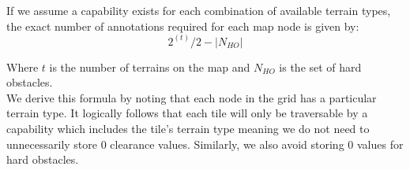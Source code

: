 If we assume a capability exists for each combination of available terrain types, the exact number of annotations required for each map node is given by:
\begin{equation}
2^(t)/2 - |N_{HO}|
\label{aha-eq:cv}
\end{equation}

Where $t$ is the number of terrains on the map and $N_{HO}$ is the set of hard obstacles. \\ \newline
We derive this formula by noting that each node in the grid has a particular terrain type. It logically follows that each tile will only be traversable by a capability which includes the tile's terrain type meaning we do not need to unnecessarily store 0 clearance values. Similarly, we also avoid storing 0 values for hard obstacles.

